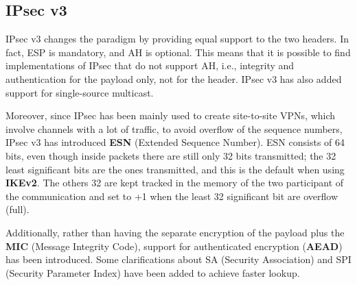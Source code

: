 \subsection{IPsec v3}

IPsec v3 changes the paradigm by providing equal support to the two headers. In fact, ESP is mandatory, and AH is optional. This means that it is possible to find implementations of IPsec that do not support AH, i.e., integrity and authentication for the payload only, not for the header. IPsec v3 has also added support for single-source multicast.

Moreover, since IPsec has been mainly used to create site-to-site VPNs, which involve channels with a lot of traffic, to avoid overflow of the sequence numbers, IPsec v3 has introduced \textbf{ESN} (Extended Sequence Number). ESN consists of 64 bits, even though inside packets there are still only 32 bits transmitted; the 32 least significant bits are the ones transmitted, and this is the default when using \textbf{IKEv2}. The others 32 are kept tracked in the memory of the two participant of the communication and set to +1 when the least 32 significant bit are overflow (full).

Additionally, rather than having the separate encryption of the payload plus the \textbf{MIC} (Message Integrity Code), support for authenticated encryption (\textbf{AEAD}) has been introduced. Some clarifications about SA (Security Association) and SPI (Security Parameter Index) have been added to achieve faster lookup.

